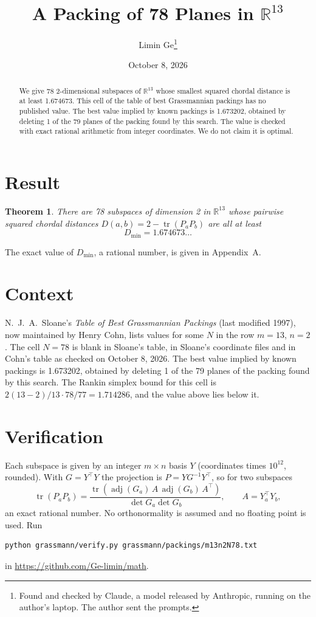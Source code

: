 \documentclass[11pt,a4paper]{article}
\title{A Packing of 78 Planes in $\mathbb{R}^{13}$}
\author{Limin Ge\thanks{Found and checked by Claude, a model released by Anthropic, running on the author's laptop. The author sent the prompts.}}
\date{October 8, 2026}
\newtheorem*{theorem}{Theorem}
\begin{document}
\maketitle
\begin{abstract}
We give 78 2-dimensional subspaces of $\mathbb{R}^{13}$ whose smallest squared chordal distance is at least 1.674673. This cell of the table of best Grassmannian packings has no published value. The best value implied by known packings is 1.673202, obtained by deleting 1 of the 79 planes of the packing found by this search. The value is checked with exact rational arithmetic from integer coordinates. We do not claim it is optimal.
\end{abstract}

\section{Result}
\begin{theorem}
There are 78 subspaces of dimension 2 in $\mathbb{R}^{13}$ whose pairwise squared chordal distances $D(a,b) = 2 - \operatorname{tr}(P_aP_b)$ are all at least
\[ D_{\min} = 1.674673\ldots \]
\end{theorem}
The exact value of $D_{\min}$, a rational number, is given in Appendix~A.


\section{Context}
N.~J.~A.~Sloane's \emph{Table of Best Grassmannian Packings} (last modified 1997), now maintained by Henry Cohn, lists values for some $N$ in the row $m=13$, $n=2$. The cell $N=78$ is blank in Sloane's table, in Sloane's coordinate files and in Cohn's table as checked on October 8, 2026. The best value implied by known packings is 1.673202, obtained by deleting 1 of the 79 planes of the packing found by this search. The Rankin simplex bound for this cell is $2(13-2)/13\cdot 78/77 = 1.714286$, and the value above lies below it.


\section{Verification}
Each subspace is given by an integer $m\times n$ basis $Y$ (coordinates times $10^{12}$, rounded). With $G=Y^\top Y$ the projection is $P=YG^{-1}Y^\top$, so for two subspaces
\[ \operatorname{tr}(P_aP_b)=\frac{\operatorname{tr}(\operatorname{adj}(G_a)\,A\,\operatorname{adj}(G_b)\,A^\top)}{\det G_a\det G_b},\qquad A=Y_a^\top Y_b, \]
an exact rational number. No orthonormality is assumed and no floating point is used. Run
\begin{verbatim}
python grassmann/verify.py grassmann/packings/m13n2N78.txt
\end{verbatim}
in \url{https://github.com/Ge-limin/math}.
\end{document}
